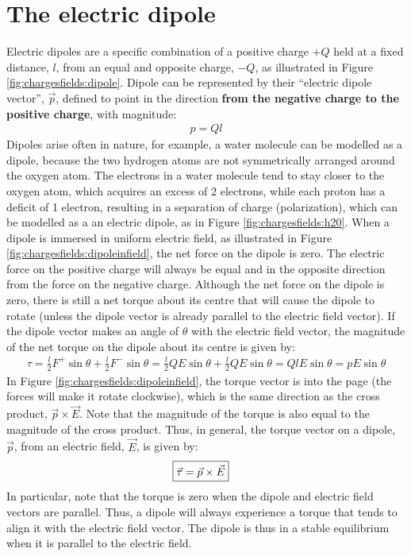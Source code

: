 \section{The electric dipole}
Electric dipoles are a specific combination of a positive charge $+Q$ held at a fixed distance, $l$, from an equal and opposite charge, $-Q$, as illustrated in Figure \ref{fig:chargesfields:dipole}. Dipole can be represented by their ``electric dipole vector'', $\vec p$, defined to point in the direction \textbf{from the negative charge to the positive charge}, with magnitude:
\begin{align*}
p=Ql
\end{align*}
Dipoles arise often in nature, for example, a water molecule can be modelled as a dipole, because the two hydrogen atoms are not symmetrically arranged around the oxygen atom. The electrons in a water molecule tend to stay closer to the oxygen atom, which acquires an excess of 2 electrons, while each proton has a deficit of 1 electron, resulting in a separation of charge (polarization), which can be modelled as a an electric dipole, as in Figure \ref{fig:chargesfields:h20}.
When a dipole is immersed in uniform electric field, as illustrated in Figure \ref{fig:chargesfields:dipoleinfield}, the net force on the dipole is zero. The electric force on the positive charge will always be equal and in the opposite direction from the force on the negative charge. 
Although the net force on the dipole is zero, there is still a net torque about its centre that will cause the dipole to rotate (unless the dipole vector is already parallel to the electric field vector). If the dipole vector makes an angle of $\theta$ with the electric field vector, the magnitude of the net torque on the dipole about its centre is given by:
\begin{align*}
\tau=\frac{l}{2}F^+\sin\theta+\frac{l}{2}F^-\sin\theta=\frac{l}{2}QE\sin\theta+\frac{l}{2}QE\sin\theta=QlE\sin\theta=pE\sin\theta
\end{align*}
In Figure \ref{fig:chargesfields:dipoleinfield}, the torque vector is into the page (the forces will make it rotate clockwise), which is the same direction as the cross product, $\vec p \times \vec E$. Note that the magnitude of the torque is also equal to the magnitude of the cross product. Thus, in general, the torque vector on a dipole, $\vec p$, from an electric field, $\vec E$, is given by:
\begin{align*}
\Aboxed{\vec \tau =\vec p \times \vec E}
\end{align*}
In particular, note that the torque is zero when the dipole and electric field vectors are parallel. Thus, a dipole will always experience a torque that tends to align it with the electric field vector. The dipole is thus in a stable equilibrium when it is parallel to the electric field.

